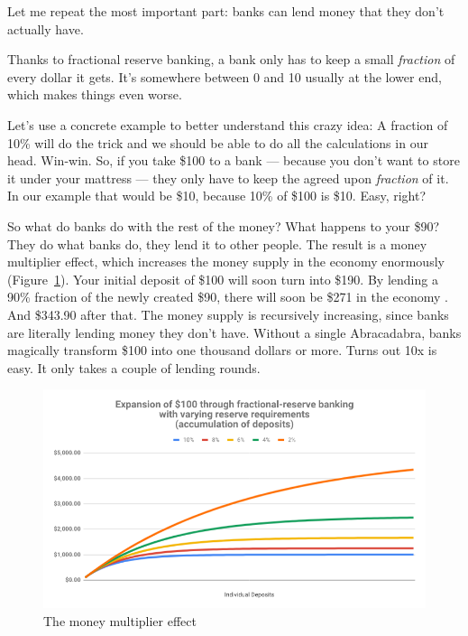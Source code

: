 Let me repeat the most important part: banks can lend money that they
don't actually have.

Thanks to fractional reserve banking, a bank only has to keep a small
\textit{fraction} of every dollar it gets. It's somewhere between 0 and 10%
usually at the lower end, which makes things even worse.

Let's use a concrete example to better understand this crazy idea: A
fraction of 10\% will do the trick and we should be able to do all the
calculations in our head. Win-win. So, if you take \$100 to a
bank --- because you don't want to store it under your mattress --- they
only have to keep the agreed upon \textit{fraction} of it. In our example that
would be \$10, because 10\% of \$100 is \$10. Easy, right?

So what do banks do with the rest of the money? What happens to your \$90? They
do what banks do, they lend it to other people. The result is a money multiplier
effect, which increases the money supply in the economy enormously
(Figure~\ref{fig:money-multiplier}). Your initial deposit of \$100 will soon
turn into \$190. By lending a 90\% fraction of the newly created \$90, there
will soon be \$271 in the economy \cite{wiki:money-multiplier}. And \$343.90 after that. The money supply is
recursively increasing, since banks are literally lending money they don't have.
Without a single Abracadabra, banks magically transform \$100 into one thousand
dollars or more. Turns out 10x is easy. It only takes a couple of lending
rounds.

\begin{figure}
  \centering
  \includegraphics{assets/images/money-multiplier.png}
  \caption{The money multiplier effect}
  \label{fig:money-multiplier}
\end{figure}

